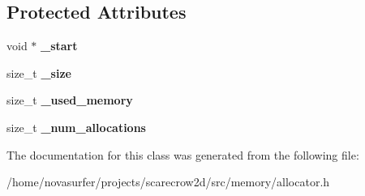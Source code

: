 \subsection*{Protected Attributes}
\begin{DoxyCompactItemize}
\item 
\mbox{\label{classsc2d_1_1memory_1_1allocator_a0688f548cd0ef36fff6585fc25e31f30}} 
void $\ast$ {\bfseries \+\_\+start}
\item 
\mbox{\label{classsc2d_1_1memory_1_1allocator_a9d5773c2a51447cf4054203a563f95c2}} 
size\+\_\+t {\bfseries \+\_\+size}
\item 
\mbox{\label{classsc2d_1_1memory_1_1allocator_a5d2fa4113436f8046742f274aba6abdf}} 
size\+\_\+t {\bfseries \+\_\+used\+\_\+memory}
\item 
\mbox{\label{classsc2d_1_1memory_1_1allocator_a21c5a6310f1e8feb470870b664b04753}} 
size\+\_\+t {\bfseries \+\_\+num\+\_\+allocations}
\end{DoxyCompactItemize}


The documentation for this class was generated from the following file\+:\begin{DoxyCompactItemize}
\item 
/home/novasurfer/projects/scarecrow2d/src/memory/allocator.\+h\end{DoxyCompactItemize}
